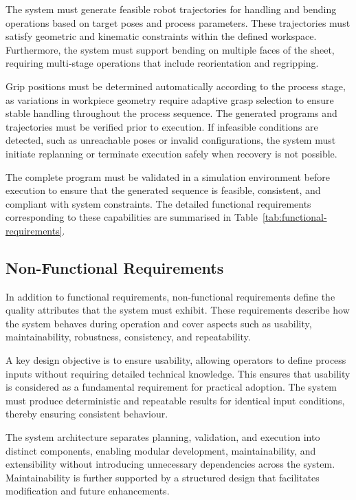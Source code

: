 The system must generate feasible robot trajectories for handling and bending operations based on target poses and process parameters. These trajectories must satisfy geometric and kinematic constraints within the defined workspace. Furthermore, the system must support bending on multiple faces of the sheet, requiring multi-stage operations that include reorientation and regripping.

Grip positions must be determined automatically according to the process stage, as variations in workpiece geometry require adaptive grasp selection to ensure stable handling throughout the process sequence. The generated programs and trajectories must be verified prior to execution. If infeasible conditions are detected, such as unreachable poses or invalid configurations, the system must initiate replanning or terminate execution safely when recovery is not possible.

The complete program must be validated in a simulation environment before execution to ensure that the generated sequence is feasible, consistent, and compliant with system constraints. The detailed functional requirements corresponding to these capabilities are summarised in Table~\ref{tab:functional-requirements}.



\subsection{Non-Functional Requirements}
\label{sec:non-functional-requirements}

In addition to functional requirements, non-functional requirements define the quality attributes that the system must exhibit. These requirements describe how the system behaves during operation and cover aspects such as usability, maintainability, robustness, consistency, and repeatability.

A key design objective is to ensure usability, allowing operators to define process inputs without requiring detailed technical knowledge. This ensures that usability is considered as a fundamental requirement for practical adoption. The system must produce deterministic and repeatable results for identical input conditions, thereby ensuring consistent behaviour.

The system architecture separates planning, validation, and execution into distinct components, enabling modular development, maintainability, and extensibility without introducing unnecessary dependencies across the system. Maintainability is further supported by a structured design that facilitates modification and future enhancements.

